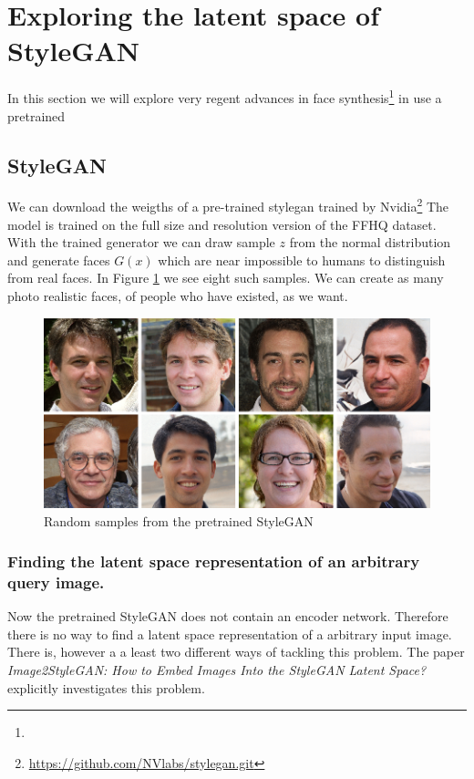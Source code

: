 \section{Exploring the latent space of StyleGAN}

In this section we will explore  very regent advances in face synthesis\footnote{} in use a pretrained

\subsection{StyleGAN}

We can download the weigths of a pre-trained stylegan trained by Nvidia\footnote{\url{https://github.com/NVlabs/stylegan.git}}\cite{stylegan}
The model is trained on the full size and resolution version of the FFHQ dataset.
With the trained generator we can draw sample $z$ from the normal distribution and generate faces $G(x)$ which are near impossible to humans to distinguish from real faces. In Figure \ref{StyleGAN-examples} we see eight such samples. We can create as many photo realistic faces, of people who have existed, as we want.

\begin{figure}
  \includegraphics[width=\textwidth]{fig/stylegan/randomsamples}
  \caption{Random samples from the pretrained StyleGAN}
  \label{StyleGAN-examples}
\end{figure}




\subsubsection{Finding the latent space representation of an arbitrary query image.}
Now the pretrained StyleGAN does not contain an encoder network. Therefore there is no way to find a latent space representation of a arbitrary input image.
There is, however a a least two different ways of tackling this problem.
%
\cite{interfacegan}
The paper \textit{Image2StyleGAN: How to Embed Images Into the StyleGAN Latent Space?}\cite{Image2StyleGAN} explicitly investigates this problem.


